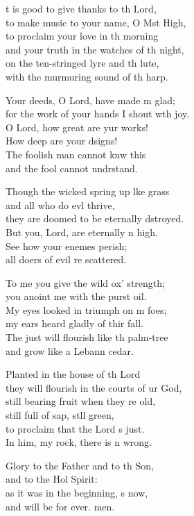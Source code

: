 \begin{psalmverse}
  \begin{patverse}
t is good to give thanks to th Lord,\Med\\
    to make music to your name, O Mst High,\\
to proclaim your love in th morning\Med\\
    and your truth in the watches of th night,\\
on the ten-stringed lyre and th lute,\Med\\
    with the murmuring sound of th harp.

Your deeds, O Lord, have made m glad;\Med\\
    for the work of your hands I shout w\pointup{\i}th joy.\\
O Lord, how great are yur works!\Med\\
    How deep are your dsigns!\\
The foolish man cannot knw this\Med\\
    and the fool cannot undrstand.

Though the wicked spring up l\pointup{\i}ke grass\Med\\
    and all who do ev\pointup{\i}l thrive,\\
they are doomed to be eternally dstroyed.\Med\\
    But you, Lord, are eternally n high.\\
See how your enem\pointup{\i}es perish;\Med\\
    all doers of evil re scattered.

To me you give the wild ox’ strength;\Med\\
    you anoint me with the purst oil.\\
My eyes looked in triumph on m foes;\Med\\
    my ears heard gladly of thir fall.\\
The just will flourish like th palm-tree\Med\\
    and grow like a Lebann cedar.

Planted in the house of th Lord\Med\\
    they will flourish in the courts of ur God,\\
still bearing fruit when they re old,\Med\\
    still full of sap, st\pointup{\i}ll green,\\
to proclaim that the Lord \pointup{\i}s just.\Med\\
    In him, my rock, there is n wrong.

Glory to the Father and to th Son,\Med\\
    and to the Hol Spirit:\\
as it was in the beginning, \pointup{\i}s now,\Med\\
    and will be for ever. men.
  \end{patverse}
  \end{psalmverse}
